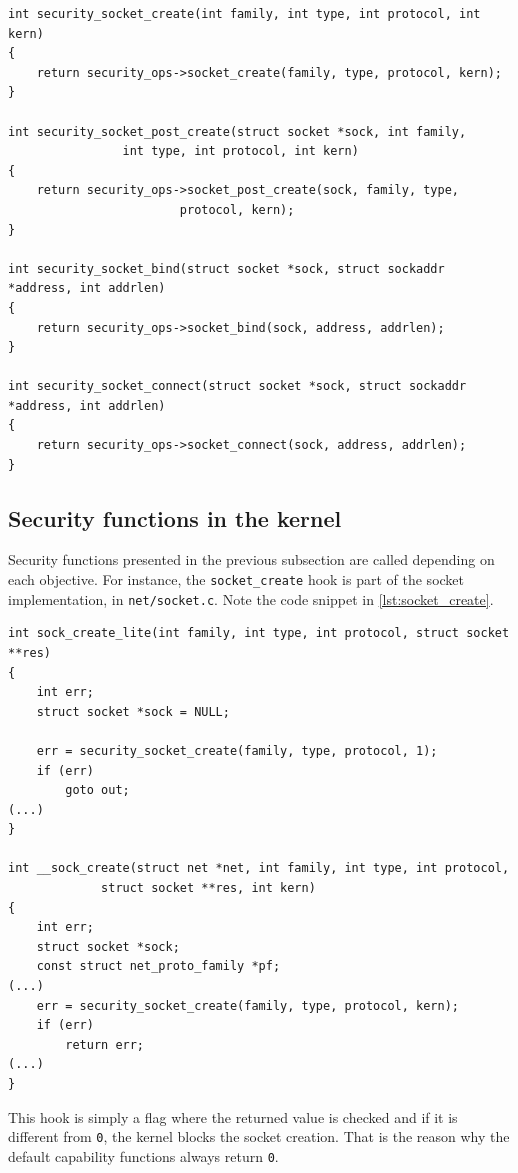 \begin{lstlisting}[frame=none, numbers=none, caption=\texttt{register\_security} function (Linux kernel v3.11), label=lst:security_func_code]
int security_socket_create(int family, int type, int protocol, int kern)
{
	return security_ops->socket_create(family, type, protocol, kern);
}

int security_socket_post_create(struct socket *sock, int family,
				int type, int protocol, int kern)
{
	return security_ops->socket_post_create(sock, family, type,
						protocol, kern);
}

int security_socket_bind(struct socket *sock, struct sockaddr *address, int addrlen)
{
	return security_ops->socket_bind(sock, address, addrlen);
}

int security_socket_connect(struct socket *sock, struct sockaddr *address, int addrlen)
{
	return security_ops->socket_connect(sock, address, addrlen);
}
\end{lstlisting}

\subsection{Security functions in the kernel}
\label{sec:security_func}

Security functions presented in the previous subsection are called depending on each objective. For instance, the \texttt{socket\_create} hook is part of the socket implementation, in \texttt{net/socket.c}. Note the code snippet in \autoref{lst:socket_create}.

\begin{lstlisting}[frame=none, numbers=none, caption=\texttt{socket\_create} hook in socket implementation (Linux kernel v3.11), label=lst:socket_create]
int sock_create_lite(int family, int type, int protocol, struct socket **res)
{
	int err;
	struct socket *sock = NULL;

	err = security_socket_create(family, type, protocol, 1);
	if (err)
		goto out;
(...)
}

int __sock_create(struct net *net, int family, int type, int protocol,
			 struct socket **res, int kern)
{
	int err;
	struct socket *sock;
	const struct net_proto_family *pf;
(...)
	err = security_socket_create(family, type, protocol, kern);
	if (err)
		return err;
(...)
}
\end{lstlisting}

\noindent
This hook is simply a flag where the returned value is checked and if it is different from \texttt{0}, the kernel blocks the socket creation. That is the reason why the default capability functions always return \texttt{0}.